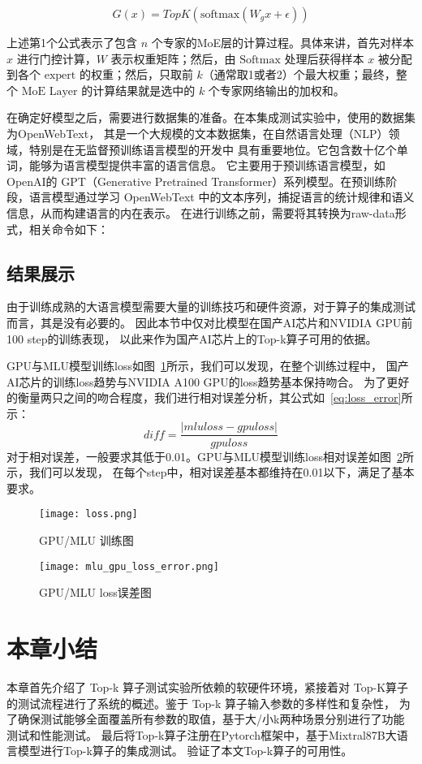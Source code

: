 \begin{equation}
G(x) = TopK(\text{softmax}(W_g x + \epsilon))
\end{equation}

上述第1个公式表示了包含 $n$ 个专家的MoE层的计算过程。具体来讲，首先对样本 $x$ 进行门控计算，$W$ 表示权重矩阵；然后，由 $\text{Softmax}$ 处理后获得样本 $x$ 被分配到各个 $\text{expert}$ 的权重；然后，只取前 $k$（通常取1或者2）个最大权重；最终，整个 $\text{MoE Layer}$ 的计算结果就是选中的 $k$ 个专家网络输出的加权和。

在确定好模型之后，需要进行数据集的准备。在本集成测试实验中，使用的数据集为OpenWebText，
其是一个大规模的文本数据集，在自然语言处理（NLP）领域，特别是在无监督预训练语言模型的开发中
具有重要地位。它包含数十亿个单词，能够为语言模型提供丰富的语言信息。
它主要用于预训练语言模型，如OpenAI的 GPT（Generative Pretrained Transformer）系列模型。在预训练阶段，语言模型通过学习 OpenWebText 中的文本序列，捕捉语言的统计规律和语义信息，从而构建语言的内在表示。
在进行训练之前，需要将其转换为raw-data形式，相关命令如下：


\subsection{结果展示}
由于训练成熟的大语言模型需要大量的训练技巧和硬件资源，对于算子的集成测试而言，其是没有必要的。
因此本节中仅对比模型在国产AI芯片和NVIDIA GPU前100 step的训练表现，
以此来作为国产AI芯片上的Top-k算子可用的依据。
    
GPU与MLU模型训练loss如图~\ref{fig:loss}所示，我们可以发现，在整个训练过程中，
国产AI芯片的训练loss趋势与NVIDIA A100 GPU的loss趋势基本保持吻合。 
为了更好的衡量两只之间的吻合程度，我们进行相对误差分析，其公式如~\ref{eq:loss_error}所示：
\begin{equation}
    \label{eq:loss_error}
    diff = \frac{\vert mluloss - gpuloss \vert}{gpuloss}
\end{equation}
对于相对误差，一般要求其低于0.01。GPU与MLU模型训练loss相对误差如图~\ref{fig:mlu_gpu_loss_error}所示，我们可以发现，
在每个step中，相对误差基本都维持在0.01以下，满足了基本要求。

\begin{figure}[ht]
    \centering
    \texttt{[image: loss.png]}
    \caption{GPU/MLU 训练图}
    \label{fig:loss}
\end{figure}

\begin{figure}[ht]
    \centering
    \texttt{[image: mlu\_gpu\_loss\_error.png]}
    \caption{GPU/MLU loss误差图}
    \label{fig:mlu_gpu_loss_error}
\end{figure}



\section{本章小结}
本章首先介绍了  Top-k 算子测试实验所依赖的软硬件环境，紧接着对 
 Top-K算子的测试流程进行了系统的概述。鉴于 Top-k 算子输入参数的多样性和复杂性， 
为了确保测试能够全面覆盖所有参数的取值，基于大/小k两种场景分别进行了功能测试和性能测试。
最后将Top-k算子注册在Pytorch框架中，基于Mixtral8\times7B大语言模型进行Top-k算子的集成测试。
验证了本文Top-k算子的可用性。